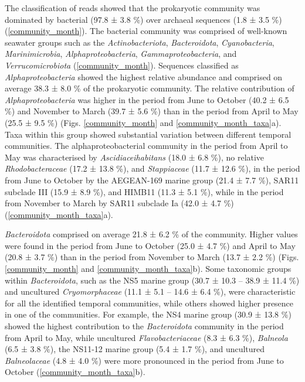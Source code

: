 \documentclass[
  12pt,
]{article}
\begin{document}
The classification of reads showed that the prokaryotic community was
dominated by bacterial (97.8 ± 3.8 \si{\percent}) over archaeal
sequences (1.8 ± 3.5 \si{\percent}) (\autoref{community_month}). The
bacterial community was comprised of well-known seawater groups such as
the \emph{Actinobacteriota}, \emph{Bacteroidota}, \emph{Cyanobacteria},
\emph{Marinimicrobia}, \emph{Alphaproteobacteria},
\emph{Gammaproteobacteria}, and \emph{Verrucomicrobiota}
(\autoref{community_month}). Sequences classified as
\emph{Alphaproteobacteria} showed the highest relative abundance and
comprised on average 38.3 ± 8.0 \si{\percent} of the prokaryotic
community. The relative contribution of \emph{Alphaproteobacteria} was
higher in the period from June to October (40.2 ± 6.5 \si{\percent}) and
November to March (39.7 ± 5.6 \si{\percent}) than in the period from
April to May (25.5 ± 9.5 \si{\percent}) (Figs. \ref{community_month} and
\ref{community_month_taxa}a). Taxa within this group showed substantial
variation between different temporal communities. The
alphaproteobacterial community in the period from April to May was
characterised by \emph{Ascidiaceihabitans} (18.0 ± 6.8 \si{\percent}),
no relative \emph{Rhodobacteraceae} (17.2 ± 13.8 \si{\percent}), and
\emph{Stappiaceae} (11.7 ± 12.6 \si{\percent}), in the period from June
to October by the AEGEAN-169 marine group (21.4 ± 7.7 \si{\percent}),
SAR11 subclade III (15.9 ± 8.9 \si{\percent}), and HIMB11 (11.3 ± 5.1
\si{\percent}), while in the period from November to March by SAR11
subclade Ia (42.0 ± 4.7 \si{\percent})
(\autoref{community_month_taxa}a).

\emph{Bacteroidota} comprised on average 21.8 ± 6.2 \si{\percent} of the
community. Higher values were found in the period from June to October
(25.0 ± 4.7 \si{\percent}) and April to May (20.8 ± 3.7 \si{\percent})
than in the period from November to March (13.7 ± 2.2 \si{\percent})
(Figs. \ref{community_month} and \ref{community_month_taxa}b). Some
taxonomic groups within \emph{Bacteroidota}, such as the NS5 marine
group (30.7 ± 10.3 -- 38.9 ± 11.4 \si{\percent}) and uncultured
\emph{Cryomorphaceae} (11.1 ± 5.1 -- 14.6 ± 6.4 \si{\percent}), were
characteristic for all the identified temporal communities, while others
showed higher presence in one of the communities. For example, the NS4
marine group (30.9 ± 13.8 \si{\percent}) showed the highest contribution
to the \emph{Bacteroidota} community in the period from April to May,
while uncultured \emph{Flavobacteriaceae} (8.3 ± 6.3 \si{\percent}),
\emph{Balneola} (6.5 ± 3.8 \si{\percent}), the NS11-12 marine group (5.4
± 1.7 \si{\percent}), and uncultured \emph{Balneolaceae} (4.8 ± 4.0
\si{\percent}) were more pronounced in the period from June to October
(\autoref{community_month_taxa}b).
\end{document}
